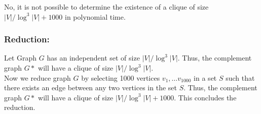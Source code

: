 \documentclass{article}
\theoremstyle{definition}
\theoremstyle{remark}
\theoremstyle{plain}
\begin{document}
No, it is not possible to determine the existence of a clique of size $|V|/\log^{3}|V| + 1000$ in polynomial time.\\

\subsubsection*{Reduction:}

Let Graph $G$ has an independent set of size $|V|/\log^{3}|V|$. Thus, the complement graph $G*$ will have a clique of size $|V|/\log^{3}|V|$.\\
Now we reduce graph $G$ by selecting 1000 vertices $v_1, \ldots v_1000$ in a set $S$ such that there exists an edge between any two vertices in the set $S$. Thus, the complement graph $G*$ will have a clique of size $|V|/\log^{3}|V|+1000$. This concludes the reduction.
\end{document}
